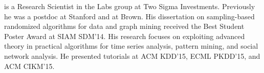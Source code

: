 \documentclass[pdfpagelabels=false]{sig-alternate-2013} %
\begin{document}
\smallskip
{} is a Research Scientist in the Labs group at Two Sigma
Investments. Previously he was a postdoc at Stanford and at Brown. His
dissertation on sampling-based randomized algorithms for data and graph mining
received the Best Student Poster Award at SIAM SDM'14. His research focuses on
exploiting advanced theory in practical algorithms for time series
analysis, pattern mining, and social network analysis. He presented
tutorials at ACM KDD'15, ECML PKDD'15, and ACM CIKM'15.


\end{document}
